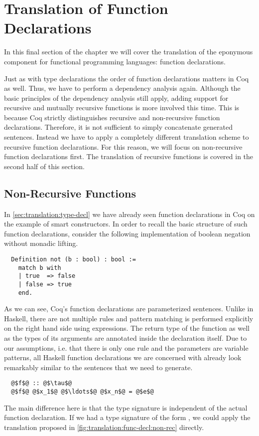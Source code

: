 \section{Translation of Function Declarations} \label{sec:translation:func-decl}
In this final section of the chapter we will cover the translation of the eponymous component for functional programming languages: function declarations.

Just as with type declarations the order of function declarations matters in Coq as well.
Thus, we have to perform a dependency analysis again.
Although the basic principles of the dependency analysis still apply, adding support for recursive and mutually recursive functions is more involved this time.
This is because Coq strictly distinguishes recursive and non-recursive function declarations.
Therefore, it is not sufficient to simply concatenate generated sentences.
Instead we have to apply a completely different translation scheme to recursive function declarations.
For this reason, we will focus on non-recursive function declarations first.
The translation of recursive functions is covered in the second half of this section.

\subsection{Non-Recursive Functions}
In \autoref{sec:translation:type-decl} we have already seen function declarations in Coq on the example of smart constructors.
In order to recall the basic structure of such function declarations, consider the following implementation of boolean negation without monadic lifting.
\begin{verbatim}
  Definition not (b : bool) : bool :=
    match b with
    | true  => false
    | false => true
    end.
\end{verbatim}
As we can see, Coq's function declarations are parameterized  sentences.
Unlike in Haskell, there are not multiple rules and pattern matching is performed explicitly on the right hand side using  expressions.
The return type of the function as well as the types of its arguments are annotated inside the declaration itself.
Due to our assumptions, i.e. that there is only one rule and the parameters are variable patterns, all Haskell function declarations we are concerned with already look remarkably similar to the  sentences that we need to generate.
\begin{verbatim}
  @$f$@ :: @$\tau$@
  @$f$@ @$x_1$@ @$\ldots$@ @$x_n$@ = @$e$@
\end{verbatim}
The main difference here is that the type signature is independent of the actual function declaration.
If we had a type signature of the form , we could apply the translation proposed in \autoref{fig:translation:func-decl:non-rec} directly.

